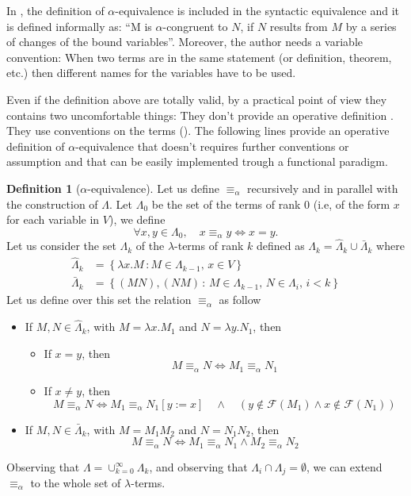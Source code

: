 \documentclass[a4paper,11pt]{article}
\theoremstyle{definition}
\newtheorem{defn}{Definition}
\newcommand{\FF}{\mathcal{F}}
\begin{document}
In \cite{Barendregt}, the definition of $\alpha$-equivalence is included in the
syntactic equivalence and it is defined informally as: ``M is
$\alpha$-congruent to $N$, if $N$ results from $M$ by a series of changes of
the bound variables''. Moreover, the author needs a variable convention: 
When two terms are in the same statement (or definition,
theorem, etc.) then different names for the variables have to be used.

Even if the definition above are totally valid, by a practical point of view
they contains two uncomfortable things: They don't provide an
operative definition \cite{Curry}. They use conventions on the terms
(\cite{Church, Barendregt}). The following lines provide an operative definition of
$\alpha$-equivalence that doesn't requires further conventions or assumption
and that can be easily implemented trough a functional paradigm.

\begin{defn}[$\alpha$-equivalence]
  \label{def:alpha_eq}
  Let us define $\equiv_\alpha$ recursively and in parallel with the
  construction of $\Lambda$.
  Let $\Lambda_0$ be the set of the terms of rank $0$ (i.e, of the form $x$ for
  each variable in $V$), we define
  \[
    \forall x,y \in \Lambda_0,\quad x\equiv_\alpha y\iff x=y.
  \]
  Let us consider the set $\Lambda_k$ of the $\lambda$-terms of rank $k$
  defined as $\Lambda_k = \hat\Lambda_k\cup \bar\Lambda_k$ where
  \[
    \begin{aligned}
      \hat \Lambda_k &=\left\{ \lambda
      x.M\,:M\in\Lambda_{k-1},\,x\in V\right\}\\
      \bar \Lambda_k&=\left\{ (MN), (NM)\,:\, M\in\Lambda_{k-1},\,N\in\Lambda_i,\,i<k \right\}
    \end{aligned}
  \]
  Let us define over this set the relation $\equiv_\alpha$ as follow
  \begin{itemize}
    \item If $M,N\in\hat\Lambda_{k}$, with $M=\lambda x.M_1$ and $N=\lambda
      y.N_1$, then
      \begin{itemize}
        \item If $x=y$, then
          \[
            M\equiv_\alpha N \iff M_1\equiv_\alpha N_1
          \]
        \item If $x\ne y$, then
          \[
            M\equiv_\alpha N \iff M_1\equiv_\alpha N_1[y:=x]\quad\wedge\quad
            (y\not\in\FF(M_1) \wedge x\not\in\FF(N_1))
          \]
      \end{itemize}
    \item If $M,N\in\bar\Lambda_k$, with $M=M_1M_2$ and $N=N_1N_2$, then
      \[
        M\equiv_\alpha N \iff M_1\equiv_\alpha N_1\wedge M_2\equiv_\alpha N_2
      \]
  \end{itemize}

  Observing that $\Lambda = \cup_{k=0}^\infty\Lambda_k$, and observing that
  $\Lambda_i\cap\Lambda_j=\emptyset$, we can extend $\equiv_\alpha$ to the
  whole set of $\lambda$-terms.
\end{defn}
\end{document}
